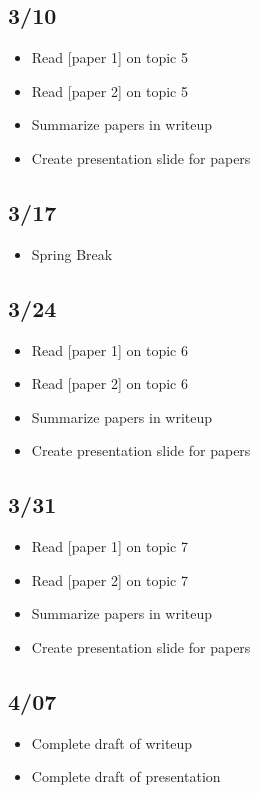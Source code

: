 \documentclass[12pt]{article}
\begin{document}
\subsection*{3/10}
\begin{itemize}
    \item Read [paper 1] on topic 5
    \item Read [paper 2] on topic 5
    \item Summarize papers in writeup
    \item Create presentation slide for papers
\end{itemize}

\subsection*{3/17}
\begin{itemize}
    \item Spring Break
\end{itemize}

\subsection*{3/24}
\begin{itemize}
    \item Read [paper 1] on topic 6
    \item Read [paper 2] on topic 6
    \item Summarize papers in writeup
    \item Create presentation slide for papers
\end{itemize}

\subsection*{3/31}
\begin{itemize}
    \item Read [paper 1] on topic 7
    \item Read [paper 2] on topic 7
    \item Summarize papers in writeup
    \item Create presentation slide for papers
\end{itemize}

\subsection*{4/07}
\begin{itemize}
    \item Complete draft of writeup
    \item Complete draft of presentation
\end{itemize}
\end{document}
